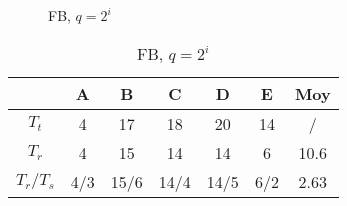 \documentclass[a4, 11pt]{article}
\begin{document}
      \begin{figure}[h!]
         \centering
         
         \caption{FB, $q=2^i$}
         \label{fig:fbqi}
      \end{figure}

               \begin{table}[ht!]
         \centering
         \begin{tabular}{c|c|c|c|c|c|c}
            & \textbf{A} & \textbf{B} & \textbf{C} & \textbf{D} & \textbf{E} & \textbf{Moy} \\ \hline
            $T_t$   & 4   &  17  &  18  &  20  &  14 & / \\ \hline
            $T_r$   &  4   &  15   & 14  &  14  &  6  &   10.6 \\ \hline
            $T_r / T_s$ & 4/3  & 15/6 & 14/4 & 14/5 & 6/2  & 2.63 \\
         \end{tabular}
         \caption{FB, $q=2^i$}
         \label{tab:fbi}
      \end{table}
\end{document}
